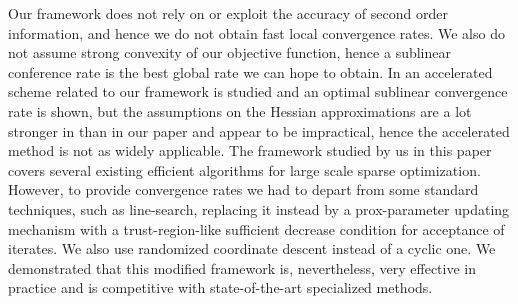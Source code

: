 \documentclass[11pt]{article}
\numberwithin{equation}{section}
\begin{document}
Our framework does not rely on or exploit the accuracy of second order information, and hence we do not obtain fast local convergence rates. We also do not assume strong convexity of our objective function, hence a sublinear conference rate is  the best global rate we can hope to obtain. In \cite{Jiangetal2012} an accelerated scheme related to our framework is studied and an optimal sublinear convergence rate is shown, but  the assumptions on the Hessian approximations are a lot stronger in  \cite{Jiangetal2012} than in our paper and appear to be impractical, hence the accelerated method is not as widely applicable. The framework studied by us in this paper covers several existing efficient algorithms for large scale sparse optimization. However, to provide convergence rates we had to depart from some standard techniques, such as line-search, replacing it instead by a prox-parameter updating mechanism with a trust-region-like sufficient decrease condition for acceptance of iterates. We also use randomized coordinate descent instead of a cyclic one. We demonstrated  that this modified framework is,  nevertheless, very effective in practice and is competitive with state-of-the-art specialized methods.


% 

\end{document}

